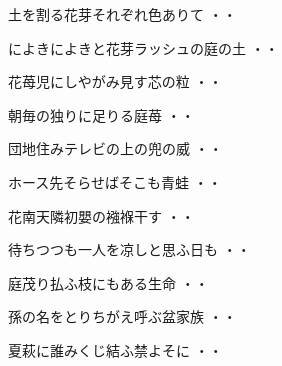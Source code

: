 \begin{shiika}土を割る花芽それぞれ色ありて
\hfill{・・}\end{shiika}
\vspace{0.6cm}
\begin{shiika}によきによきと花芽ラッシュの庭の土
\hfill{・・}\end{shiika}
\vspace{0.6cm}
\begin{shiika}花苺児にしやがみ見す芯の粒
\hfill{・・}\end{shiika}
\vspace{0.6cm}
\begin{shiika}朝毎の独りに足りる庭苺
\hfill{・・}\end{shiika}
\vspace{0.6cm}
\begin{shiika}団地住みテレビの上の兜の威
\hfill{・・}\end{shiika}
\vspace{0.6cm}
\begin{shiika}ホース先そらせばそこも青蛙
\hfill{・・}\end{shiika}
\vspace{0.6cm}
\begin{shiika}花南天隣初嬰の襁褓干す
\hfill{・・}\end{shiika}
\vspace{0.6cm}
\begin{shiika}待ちつつも一人を凉しと思ふ日も
\hfill{・・}\end{shiika}
\vspace{0.6cm}
\begin{shiika}庭茂り払ふ枝にもある生命
\hfill{・・}\end{shiika}
\vspace{0.6cm}
\begin{shiika}孫の名をとりちがえ呼ぶ盆家族
\hfill{・・}\end{shiika}
\vspace{0.6cm}
\begin{shiika}夏萩に誰みくじ結ふ禁よそに
\hfill{・・}\end{shiika}
\vspace{0.6cm}
